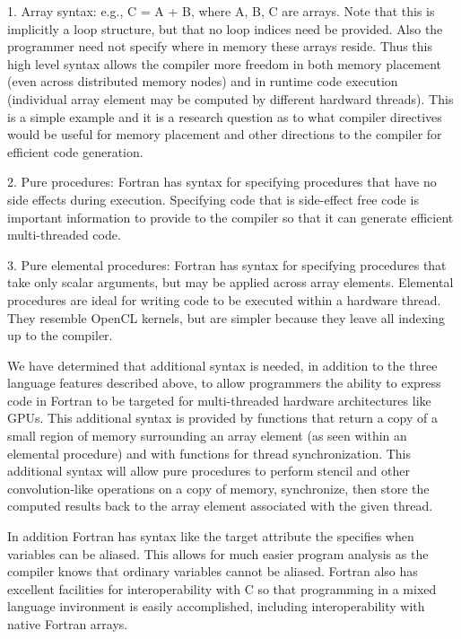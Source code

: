 1. Array syntax: e.g., C = A + B, where A, B, C are arrays.  Note that this is implicitly a loop structure, but that no loop indices need be provided.  Also the programmer need not specify where in memory these arrays reside.  Thus this high level syntax allows the compiler more freedom in both memory placement (even across distributed memory nodes) and in runtime code execution (individual array element may be computed by different hardward threads).  This is a simple example and it is a research question as to what compiler directives would be useful for memory placement and other directions to the compiler for efficient code generation.

2. Pure procedures:  Fortran has syntax for specifying procedures that have no side effects during execution.  Specifying code that is side-effect free code is important information to provide to the compiler so that it can generate efficient multi-threaded code.

3. Pure elemental procedures: Fortran has syntax for specifying procedures that take only scalar arguments, but may be applied across array elements.  Elemental procedures are ideal for writing code to be executed within a hardware thread.  They resemble OpenCL kernels, but are simpler because they leave all indexing up to the compiler.

We have determined that additional syntax is needed, in addition to the three language features described above, to allow programmers the ability to express code in Fortran to be targeted for multi-threaded hardware architectures like GPUs.  This additional syntax is provided by functions that return a copy of a small region of memory surrounding an array element (as seen within an elemental procedure) and with functions for thread synchronization.  This additional syntax will allow pure procedures to perform stencil and other convolution-like operations on a copy of memory, synchronize, then store the computed results back to the array element associated with the given thread.

In addition Fortran has syntax like the target attribute the specifies when variables can be aliased.  This allows for much easier program analysis as the compiler knows that ordinary variables cannot be aliased.  Fortran also has excellent facilities for interoperability with C so that programming in a mixed language invironment is easily accomplished, including interoperability with native Fortran arrays.
